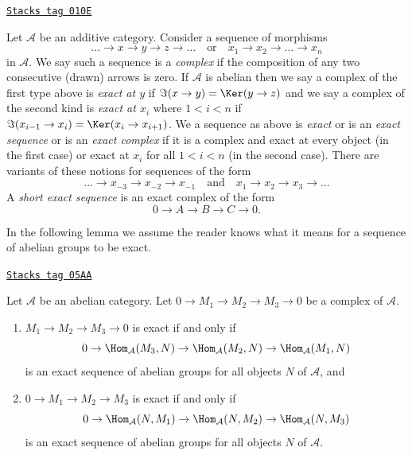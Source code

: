 \begin{definition}[Exact]
\label{homology-definition-exact}
\href{https://stacks.math.columbia.edu/tag/010E}{\texttt{Stacks tag 010E}}

Let $\mathcal{A}$ be an additive category. Consider a sequence of morphisms
$$
\ldots \to x \to y \to z \to \ldots
\quad\text{or}\quad
x_1 \to x_2 \to \ldots \to x_n
$$
in $\mathcal{A}$. We say such a sequence is a {\it complex} if the
composition of any two consecutive (drawn) arrows is zero.
If $\mathcal{A}$ is abelian then we say a complex of the first
type above is {\it exact at $y$} if $\Im(x \to y) = \Ker(y \to z)$
and we say a complex of the second kind is {\it exact at $x_i$}
where $1 < i < n$ if
$\Im(x_{i - 1} \to x_i) = \Ker(x_i \to x_{i + 1})$. We a
sequence as above is {\it exact} or is an {\it exact sequence} or is an
{\it exact complex} if it is a complex and exact at every object (in
the first case) or exact at $x_i$ for all $1 < i < n$ (in the second case).
There are variants of these notions for sequences of the form
$$
\ldots \to x_{-3} \to x_{-2} \to x_{-1}
\quad\text{and}\quad
x_1 \to x_2 \to x_3 \to \ldots
$$
A {\it short exact sequence} is an exact complex of the form
$$
0 \to A  \to B \to C \to 0.
$$
\end{definition}

In the following lemma we assume the reader knows what it means
for a sequence of abelian groups to be exact.

\begin{lemma}
\label{homology-lemma-check-exactness}
\href{https://stacks.math.columbia.edu/tag/05AA}{\texttt{Stacks tag 05AA}}

Let $\mathcal{A}$ be an abelian category.
Let $0 \to M_1 \to M_2 \to M_3 \to 0$ be a complex of $\mathcal{A}$.
\begin{enumerate}
\item $M_1 \to M_2 \to M_3 \to 0$ is exact if and only if
$$
0 \to \Hom_\mathcal{A}(M_3, N) \to
\Hom_\mathcal{A}(M_2, N) \to \Hom_\mathcal{A}(M_1, N)
$$
is an exact sequence of abelian groups for all objects $N$ of
$\mathcal{A}$, and
\item $0 \to M_1 \to M_2 \to M_3$ is exact if and only if
$$
0 \to \Hom_\mathcal{A}(N, M_1) \to \Hom_\mathcal{A}(N, M_2) \to
\Hom_\mathcal{A}(N, M_3)
$$
is an exact sequence of abelian groups for all objects $N$ of $\mathcal{A}$.
\end{enumerate}
\end{lemma}

